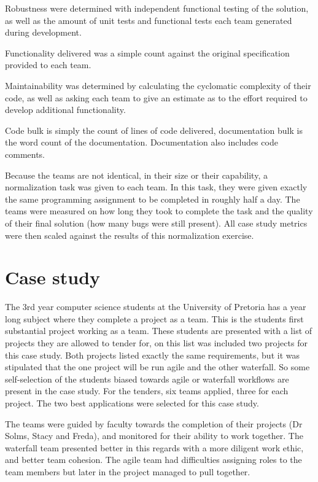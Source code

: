 \documentclass{sig-alternate-05-2015}
\begin{document}
Robustness were determined with independent functional testing of the solution, as well as the amount of unit tests and functional tests each team generated during development. 

Functionality delivered was a simple count against the original specification provided to each team.

Maintainability was determined by calculating the cyclomatic complexity of their code, as well as asking each team to give an estimate as to the effort required to develop additional functionality.

Code bulk is simply the count of lines of code delivered, documentation bulk is the word count of the documentation. Documentation also includes code comments.

Because the teams are not identical, in their size or their capability, a normalization task was given to each team. In this task, they were given exactly the same programming assignment to be completed in roughly half a day. The teams were measured on how long they took to complete the task and the quality of their final solution (how many bugs were still present). All case study metrics were then scaled against the results of this normalization exercise.

\section{Case study}

The 3rd year computer science students at the University of Pretoria has a year long subject where they complete a project as a team. This is the students first substantial project working as a team. These students are presented with a list of projects they are allowed to tender for, on this list was included two projects for this case study. Both projects listed exactly the same requirements, but it was stipulated that the one project will be run agile and the other waterfall. So some self-selection of the students biased towards agile or waterfall workflows are present in the case study. For the tenders, six teams applied, three for each project. The two best applications were selected for this case study.

The teams were guided by faculty towards the completion of their projects (Dr Solms, Stacy and Freda), and monitored for their ability to work together. The waterfall team presented better in this regards with a more diligent work ethic, and better team cohesion. The agile team had difficulties assigning roles to the team members but later in the project managed to pull together.
\end{document}
